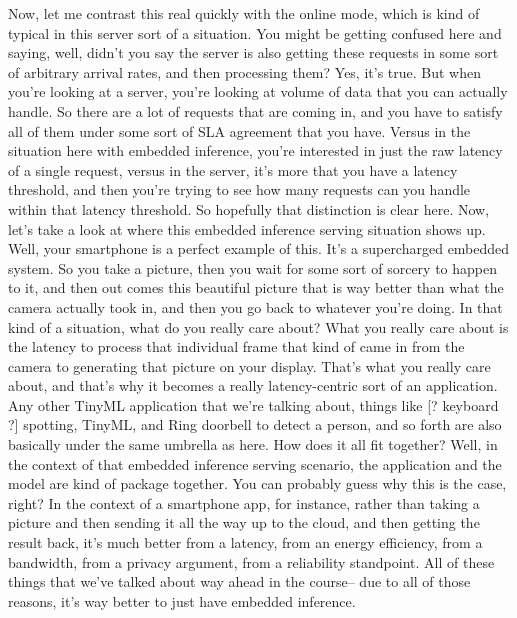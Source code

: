 {{{{{{{    Now, let me contrast this real quickly with the online mode, which
    is kind of typical in this server sort of a situation.
    You might be getting confused here and saying, well,
    didn't you say the server is also getting
    these requests in some sort of arbitrary arrival rates,
    and then processing them?
    Yes, it's true.
    But when you're looking at a server, you're looking at volume of data
    that you can actually handle.
    So there are a lot of requests that are coming in,
    and you have to satisfy all of them under some sort of SLA agreement
    that you have.
    Versus in the situation here with embedded inference,
    you're interested in just the raw latency of a single request,
    versus in the server, it's more that you have a latency threshold,
    and then you're trying to see how many requests can you
    handle within that latency threshold.
    So hopefully that distinction is clear here.
    Now, let's take a look at where this embedded inference serving situation
    shows up.
    Well, your smartphone is a perfect example of this.
    It's a supercharged embedded system.
    So you take a picture, then you wait for some sort of sorcery to happen to it,
    and then out comes this beautiful picture that
    is way better than what the camera actually took in,
    and then you go back to whatever you're doing.
    In that kind of a situation, what do you really care about?
    What you really care about is the latency
    to process that individual frame that kind of came
    in from the camera to generating that picture on your display.
    That's what you really care about, and that's
    why it becomes a really latency-centric sort of an application.
    Any other TinyML application that we're talking about,
    things like [? keyboard ?] spotting, TinyML, and Ring doorbell
    to detect a person, and so forth are also basically
    under the same umbrella as here.
    How does it all fit together?
    Well, in the context of that embedded inference serving scenario,
    the application and the model are kind of package together.
    You can probably guess why this is the case, right?
    In the context of a smartphone app, for instance, rather than taking a picture
    and then sending it all the way up to the cloud,
    and then getting the result back, it's much better from a latency,
    from an energy efficiency, from a bandwidth, from a privacy argument,
    from a reliability standpoint.
    All of these things that we've talked about way ahead in the course--
    due to all of those reasons, it's way better to just have embedded inference.
}}}}}}}

